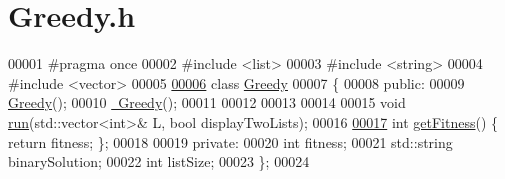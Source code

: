 \hypertarget{_greedy_8h_source}{}\section{Greedy.\+h}
\label{_greedy_8h_source}

\begin{DoxyCode}
00001 \textcolor{preprocessor}{#pragma once}
00002 \textcolor{preprocessor}{#include <list>}
00003 \textcolor{preprocessor}{#include <string>}
00004 \textcolor{preprocessor}{#include <vector>}
00005 
\hypertarget{_greedy_8h_source_l00006}{}\hyperlink{class_greedy}{00006} \textcolor{keyword}{class }\hyperlink{class_greedy}{Greedy}
00007 \{
00008 \textcolor{keyword}{public}:
00009     \hyperlink{class_greedy_a916c0ab051f780c4d3ccec06f44bbf6c}{Greedy}();
00010     \hyperlink{class_greedy_a0d51cf66b934aec2d1a834ea1c1feb1f}{~Greedy}();
00011 
00012 
00013 
00014 
00015     \textcolor{keywordtype}{void} \hyperlink{class_greedy_ac51edbfaebb1e123c887b923be647892}{run}(std::vector<int>& L, \textcolor{keywordtype}{bool} displayTwoLists);
00016 
\hypertarget{_greedy_8h_source_l00017}{}\hyperlink{class_greedy_a02a3d97f6cc544571aa33376ce9c6ebb}{00017}     \textcolor{keywordtype}{int} \hyperlink{class_greedy_a02a3d97f6cc544571aa33376ce9c6ebb}{getFitness}() \{ \textcolor{keywordflow}{return} fitness; \};
00018 
00019 \textcolor{keyword}{private}:
00020     \textcolor{keywordtype}{int} fitness;
00021     std::string binarySolution;
00022     \textcolor{keywordtype}{int} listSize;
00023 \};
00024 
\end{DoxyCode}
